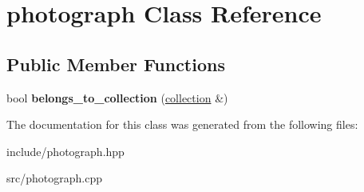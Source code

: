 \hypertarget{classphotograph}{}\section{photograph Class Reference}
\label{classphotograph}
\subsection*{Public Member Functions}
\begin{DoxyCompactItemize}
\item 
bool {\bfseries belongs\+\_\+to\+\_\+collection} (\hyperlink{classcollection}{collection} \&)\hypertarget{classphotograph_acefa96f6dddb06b2b0aca236eb1d18c9}{}\label{classphotograph_acefa96f6dddb06b2b0aca236eb1d18c9}

\end{DoxyCompactItemize}


The documentation for this class was generated from the following files\+:\begin{DoxyCompactItemize}
\item 
include/photograph.\+hpp\item 
src/photograph.\+cpp\end{DoxyCompactItemize}
